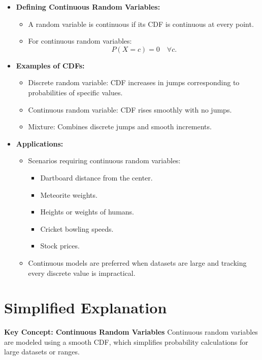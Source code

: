 \documentclass{article}
\begin{document}
\begin{itemize}
  \item \textbf{Defining Continuous Random Variables:}
    \begin{itemize}
      \item A random variable is continuous if its CDF is continuous at every point.
      \item For continuous random variables:
        \[
          P(X = c) = 0 \quad \forall c.
        \]
    \end{itemize}

  \item \textbf{Examples of CDFs:}
    \begin{itemize}
      \item Discrete random variable: CDF increases in jumps corresponding to probabilities of specific values.
      \item Continuous random variable: CDF rises smoothly with no jumps.
      \item Mixture: Combines discrete jumps and smooth increments.
    \end{itemize}

  \item \textbf{Applications:}
    \begin{itemize}
      \item Scenarios requiring continuous random variables:
        \begin{itemize}
          \item Dartboard distance from the center.
          \item Meteorite weights.
          \item Heights or weights of humans.
          \item Cricket bowling speeds.
          \item Stock prices.
        \end{itemize}
      \item Continuous models are preferred when datasets are large and tracking every discrete value is impractical.
    \end{itemize}
\end{itemize}

\section*{Simplified Explanation}

\textbf{Key Concept: Continuous Random Variables}
Continuous random variables are modeled using a smooth CDF, which simplifies probability calculations for large datasets or ranges.
\end{document}
